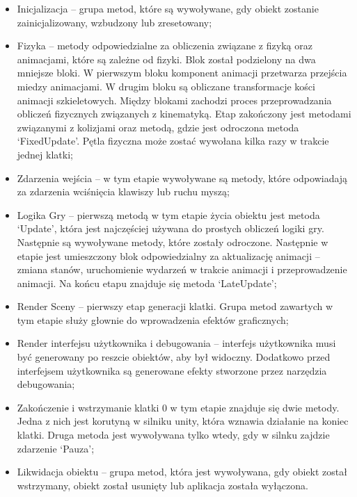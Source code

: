\documentclass[12pt,twoside]{article}
\begin{document}
\begin{itemize}
\item Inicjalizacja – grupa metod, które są wywoływane, gdy obiekt zostanie
zainicjalizowany, wzbudzony lub zresetowany;
\item Fizyka – metody odpowiedzialne za obliczenia związane z fizyką oraz
animacjami, które są zależne od fizyki. Blok został podzielony na dwa mniejsze
bloki. W pierwszym bloku komponent animacji przetwarza przejścia miedzy
animacjami. W drugim bloku są obliczane transformacje kości animacji
szkieletowych. Między blokami zachodzi proces przeprowadzania obliczeń
fizycznych związanych z kinematyką. Etap zakończony jest metodami związanymi z
kolizjami oraz metodą, gdzie jest odroczona metoda ‘FixedUpdate’. Pętla fizyczna
może zostać wywołana kilka razy w trakcie jednej klatki; 
\item Zdarzenia wejścia – w tym etapie wywoływane są metody, które odpowiadają
za zdarzenia wciśnięcia klawiszy lub ruchu myszą;
\item Logika Gry – pierwszą metodą w tym etapie życia obiektu jest metoda
‘Update’, która jest najczęściej używana do prostych obliczeń logiki gry.
Następnie są wywoływane metody, które zostały odroczone. Następnie w etapie jest
umieszczony blok odpowiedzialny za aktualizację animacji – zmiana stanów,
uruchomienie wydarzeń w trakcie animacji i przeprowadzenie animacji. Na końcu
etapu znajduje się metoda ‘LateUpdate’;
\item Render Sceny – pierwszy etap generacji klatki. Grupa metod zawartych w tym
etapie służy głownie do wprowadzenia efektów graficznych;
\item Render interfejsu użytkownika i debugowania – interfejs użytkownika musi
być generowany po reszcie obiektów, aby był widoczny. Dodatkowo przed
interfejsem użytkownika są generowane efekty stworzone przez narzędzia
debugowania;
\item Zakończenie i wstrzymanie klatki 0 w tym etapie znajduje się dwie metody.
Jedna z nich jest korutyną w silniku unity, która wznawia działanie na koniec
klatki. Druga metoda jest wywoływana tylko wtedy, gdy w silnku zajdzie zdarzenie
‘Pauza’;
\item Likwidacja obiektu – grupa metod, która jest wywoływana, gdy obiekt został
wstrzymany, obiekt został usunięty lub aplikacja została wyłączona. 
\end{itemize}
\end{document}
